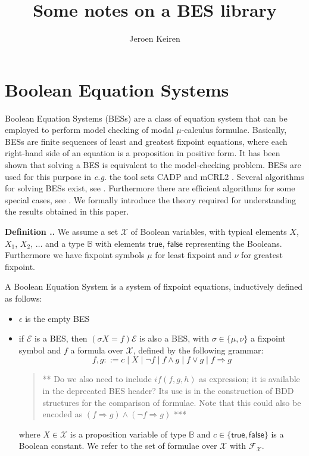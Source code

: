 \documentclass[a4paper,11pt]{article}
\title{Some notes on a BES library}
\author{Jeroen Keiren}
\newcommand{\eg}{\textit{e.g.}\xspace }
\newcommand{\mc}[1]{\ensuremath{\mathcal{#1}}}
\newcommand{\bool}{\ensuremath{\mathbb{B}}}   %
\newcommand{\true}{\ensuremath{\mathsf{true}}}
\newcommand{\false}{\ensuremath{\mathsf{false}}}
\newcommand{\imp}{\ensuremath{\Rightarrow}}
\newcommand{\comment}[1]{\begin{quotation} {\sf *** #1 ***} \end{quotation}}
\newcounter{theoremcnt}[section]
\renewcommand{\thetheoremcnt}{\thesection.\arabic{theoremcnt}}
\newenvironment{definition}%
{\begin{trivlist}\refstepcounter{theoremcnt}
\item{\bf Definition \thetheoremcnt.}}
{\end{trivlist}}
\begin{document}
\maketitle

\section{Boolean Equation Systems}
Boolean Equation Systems (BESs) \cite{Mader1997} are a class of equation
system that can be employed to perform model checking of modal $\mu$-calculus
formulae. Basically, BESs are finite sequences of least and greatest fixpoint
equations, where each right-hand side of an equation is a proposition in
positive form. It has been shown \cite{Mader1997} that solving a BES is equivalent
to the model-checking problem. BESs are used for this purpose in \eg the tool sets
CADP \cite{GaravelLMS2007} and mCRL2
\cite{GrooteMWU2007}. Several algorithms for solving BESs exist, see
\cite{Mader1997, Keinanen2006}. Furthermore there are efficient algorithms
for some special cases, see \cite{Mateescu2003, Keinanen2006}. We formally introduce
the theory required for understanding the results obtained in this paper.

\begin{definition}
We assume a set $\mc{X}$ of Boolean variables, with typical elements $X$, $X_1$,
$X_2$, $\dots$ and a type $\bool$ with elements $\true$, $\false$ representing
the Booleans. Furthermore we have fixpoint symbols $\mu$ for least
fixpoint and $\nu$ for greatest fixpoint.

A Boolean Equation System is a system of fixpoint equations, inductively defined
as follows:
\begin{itemize}
\item $\epsilon$ is the empty BES
\item if $\mc{E}$ is a BES, then $(\sigma X = f)\mc{E}$ is also a BES, with
$\sigma \in \{ \mu, \nu \}$ a fixpoint symbol and $f$ a formula
over $\mc{X}$, defined by the following grammar:
\begin{equation*}
  f,g ::= c \mid X \mid \neg f \mid f \land g \mid f \lor g \mid f \imp g
\end{equation*}
\comment{Do we also need to include $if(f,g,h)$ as expression; it is available
in the deprecated BES header? Its use is in the construction of BDD structures for the comparison of formulae. Note that this could also be encoded as $(f \imp g) \land (\neg f \imp g)$}
where $X \in \mc{X}$ is a proposition variable of type $\bool$ and $c \in \{ \true, \false \}$ is a Boolean constant. We refer to the set of formulae over
$\mc{X}$ with $\mc{F}_{\mc{X}}$.
\end{itemize}
\end{definition}
\end{document}
